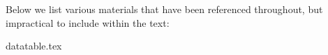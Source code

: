 \documentclass[class=article, crop=false]{standalone}
\begin{document}
	Below we list various materials that have been referenced throughout, but impractical to include within the text:

	{datatable.tex}
\end{document}
